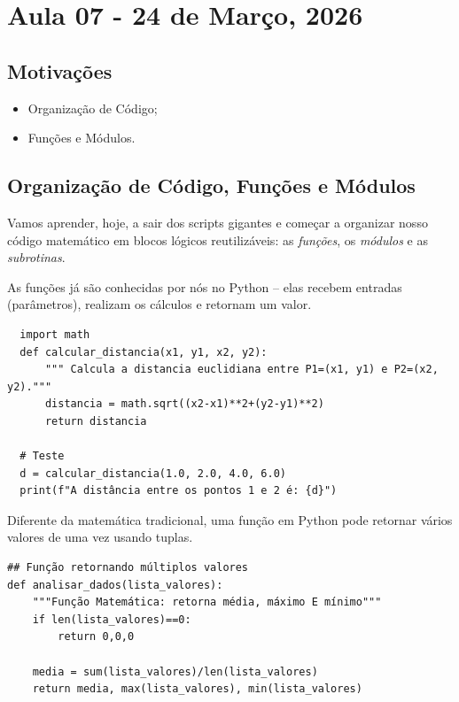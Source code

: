 \documentclass[../numerical_methods.tex]{subfiles}
\begin{document}
\section{Aula 07 - 24 de Março, 2026}
\subsection{Motivações}
\begin{itemize}
	\item Organização de Código;
	\item Funções e Módulos.
\end{itemize}
\subsection{Organização de Código, Funções e Módulos}
Vamos aprender, hoje, a sair dos scripts gigantes e começar a organizar nosso código matemático em blocos lógicos reutilizáveis: as \textit{funções}, os \textit{módulos} e as \textit{subrotinas}.

As funções já são conhecidas por nós no Python -- elas recebem entradas (parâmetros), realizam os cálculos e retornam um valor.
\begin{listing}
	\caption{Calculando a Distância entre Dois Pontos}
	\begin{verbatim}
  import math 
  def calcular_distancia(x1, y1, x2, y2):
      """ Calcula a distancia euclidiana entre P1=(x1, y1) e P2=(x2, y2)."""
      distancia = math.sqrt((x2-x1)**2+(y2-y1)**2)
      return distancia

  # Teste
  d = calcular_distancia(1.0, 2.0, 4.0, 6.0)
  print(f"A distância entre os pontos 1 e 2 é: {d}")
  \end{verbatim}
\end{listing}
Diferente da matemática tradicional, uma função em Python pode retornar vários valores de uma vez usando tuplas.
\begin{verbatim}
## Função retornando múltiplos valores 
def analisar_dados(lista_valores):
    """Função Matemática: retorna média, máximo E mínimo"""
    if len(lista_valores)==0:
        return 0,0,0

    media = sum(lista_valores)/len(lista_valores)
    return media, max(lista_valores), min(lista_valores)
\end{verbatim}
\end{document}
